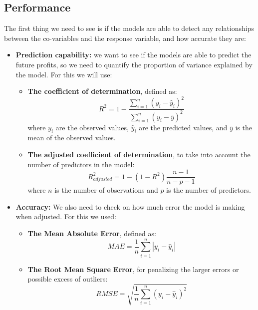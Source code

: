 \documentclass[11pt,english,a4paper,hidelinks]{book}
\begin{document}
\subsection{Performance}
The first thing we need to see is if the models are able to detect any relationships between the co-variables and the response variable, and how accurate they are:
\begin{itemize}
    \item \textbf{Prediction capability:} we want to see if the models are able to predict the future profits, so we need to quantify the proportion of variance explained by the model. For this we will use:
    \begin{itemize}
        \item  \textbf{The coefficient of determination}, defined as:
        \begin{equation}
            R^2 = 1 - \frac{\sum_{i=1}^{n} (y_i - \hat{y}_i)^2}{\sum_{i=1}^{n} (y_i - \bar{y})^2}
        \end{equation}
        where $y_i$ are the observed values, $\hat{y}_i$ are the predicted values, and $\bar{y}$ is the mean of the observed values.
        \item \textbf{The adjusted coefficient of determination}, to take into account the number of predictors in the model:
        \begin{equation}
            R^2_{adjusted} = 1 - \left(1 - R^2\right) \frac{n - 1}{n - p - 1}
        \end{equation}
        where $n$ is the number of observations and $p$ is the number of predictors.
    \end{itemize}
    \item \textbf{Accuracy:} We also need to check on how much error the model is making when adjusted. For this we used:
    \begin{itemize}
        \item \textbf{The Mean Absolute Error}, defined as:
        \begin{equation}
            MAE = \frac{1}{n} \sum_{i=1}^{n} |y_i - \hat{y}_i|
        \end{equation}
        \item \textbf{The Root Mean Square Error}, for penalizing the larger errors or possible excess of outliers:
        \begin{equation}
            RMSE = \sqrt{\frac{1}{n} \sum_{i=1}^{n} (y_i - \hat{y}_i)^2}
        \end{equation}
       
    \end{itemize}
\end{itemize}
\end{document}

